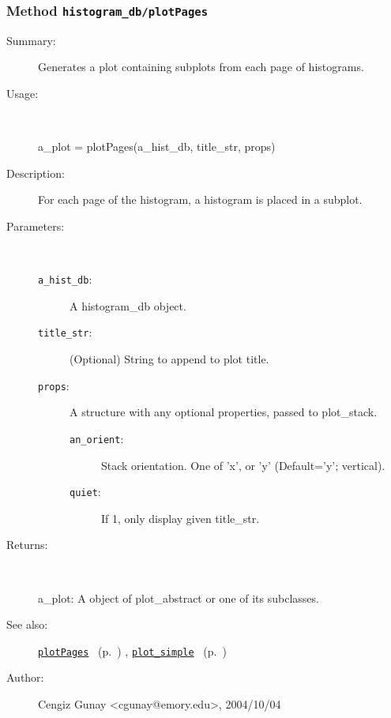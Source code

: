 \subsubsection[Method \texttt{plotPages}]{Method \texttt{histogram\_db/plotPages}}%
%
\label{ref_histogram_db__plotPages}%
\hypertarget{ref_histogram_db__plotPages}{}%
\begin{description}
\item[Summary:]Generates a plot containing subplots from each page of histograms.
%
\item[Usage:]~%
\begin{lyxcode}%
a\_plot = plotPages(a\_hist\_db, title\_str, props)
%
\end{lyxcode}%
%
\item[Description:]%
For each page of the histogram, a histogram is placed in a subplot.
\item[Parameters:]~
\begin{description}%
\item[\texttt{a\_hist\_db}:]
 A histogram\_db object.
\item[\texttt{title\_str}:]
 (Optional) String to append to plot title.
\item[\texttt{props}:]
 A structure with any optional properties, passed to plot\_stack.
\begin{description}%
\item[\texttt{an\_orient}:]
 Stack orientation. One of 'x', or 'y' (Default='y'; vertical).
\item[\texttt{quiet}:]
 If 1, only display given title\_str.
\end{description}%
\end{description}%
%
\item[Returns:
]~

	a\_plot: A object of plot\_abstract or one of its subclasses.
%
%
\item[See also:]%
\hyperlink{ref_plotPages}{\texttt{plotPages}}%
\ (p.~\pageref{ref_plotPages})%
%
, \hyperlink{ref_plot_simple}{\texttt{plot\_simple}}%
\ (p.~\pageref{ref_plot_simple})%
%
%
\item[Author:]%
Cengiz Gunay <cgunay@emory.edu>, 2004/10/04
%
\end{description}
\methodline%
